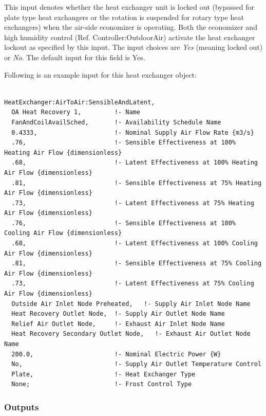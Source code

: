 This input denotes whether the heat exchanger unit is locked out (bypassed for plate type heat exchangers or the rotation is suspended for rotary type heat exchangers) when the air-side economizer is operating. Both the economizer and high humidity control (Ref. Controller:OutdoorAir) activate the heat exchanger lockout as specified by this input. The input choices are \emph{Yes} (meaning locked out) or \emph{No}. The default input for this field is Yes.

Following is an example input for this heat exchanger object:

\begin{lstlisting}

HeatExchanger:AirToAir:SensibleAndLatent,
  OA Heat Recovery 1,         !- Name
  FanAndCoilAvailSched,       !- Availability Schedule Name
  0.4333,                     !- Nominal Supply Air Flow Rate {m3/s}
  .76,                        !- Sensible Effectiveness at 100% Heating Air Flow {dimensionless}
  .68,                        !- Latent Effectiveness at 100% Heating Air Flow {dimensionless}
  .81,                        !- Sensible Effectiveness at 75% Heating Air Flow {dimensionless}
  .73,                        !- Latent Effectiveness at 75% Heating Air Flow {dimensionless}
  .76,                        !- Sensible Effectiveness at 100% Cooling Air Flow {dimensionless}
  .68,                        !- Latent Effectiveness at 100% Cooling Air Flow {dimensionless}
  .81,                        !- Sensible Effectiveness at 75% Cooling Air Flow {dimensionless}
  .73,                        !- Latent Effectiveness at 75% Cooling Air Flow {dimensionless}
  Outside Air Inlet Node Preheated,   !- Supply Air Inlet Node Name
  Heat Recovery Outlet Node,  !- Supply Air Outlet Node Name
  Relief Air Outlet Node,     !- Exhaust Air Inlet Node Name
  Heat Recovery Secondary Outlet Node,   !- Exhaust Air Outlet Node Name
  200.0,                      !- Nominal Electric Power {W}
  No,                         !- Supply Air Outlet Temperature Control
  Plate,                      !- Heat Exchanger Type
  None;                       !- Frost Control Type
\end{lstlisting}

\subsubsection{Outputs}\label{outputs-1-012}

